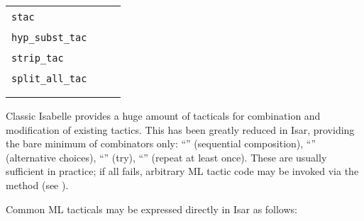 \begin{isabellebody}
\begin{isamarkuptext}
  \medskip
  \begin{tabular}{lll}
    \verb|stac|~\isa{{\isachardoublequote}a\ {\isadigit{1}}{\isachardoublequote}} & & \isa{{\isachardoublequote}subst\ a{\isachardoublequote}} \\
    \verb|hyp_subst_tac|~\isa{{\isadigit{1}}} & & \isa{hypsubst} \\
    \verb|strip_tac|~\isa{{\isadigit{1}}} & \isa{{\isachardoublequote}{\isasymapprox}{\isachardoublequote}} & \isa{{\isachardoublequote}intro\ strip{\isachardoublequote}} \\
    \verb|split_all_tac|~\isa{{\isadigit{1}}} & & \isa{{\isachardoublequote}simp\ {\isacharparenleft}no{\isacharunderscore}asm{\isacharunderscore}simp{\isacharparenright}\ only{\isacharcolon}\ split{\isacharunderscore}tupled{\isacharunderscore}all{\isachardoublequote}} \\
      & \isa{{\isachardoublequote}{\isasymapprox}{\isachardoublequote}} & \isa{{\isachardoublequote}simp\ only{\isacharcolon}\ split{\isacharunderscore}tupled{\isacharunderscore}all{\isachardoublequote}} \\
      & \isa{{\isachardoublequote}{\isasymlless}{\isachardoublequote}} & \isa{{\isachardoublequote}clarify{\isachardoublequote}} \\
  \end{tabular}%
\end{isamarkuptext}%
\isamarkuptrue%
%
\isamarkuptrue%
%
\begin{isamarkuptext}%
Classic Isabelle provides a huge amount of tacticals for combination
  and modification of existing tactics.  This has been greatly reduced
  in Isar, providing the bare minimum of combinators only: ``\isa{{\isachardoublequote}{\isacharcomma}{\isachardoublequote}}'' (sequential composition), ``\isa{{\isachardoublequote}{\isacharbar}{\isachardoublequote}}'' (alternative
  choices), ``\isa{{\isachardoublequote}{\isacharquery}{\isachardoublequote}}'' (try), ``\isa{{\isachardoublequote}{\isacharplus}{\isachardoublequote}}'' (repeat at least
  once).  These are usually sufficient in practice; if all fails,
  arbitrary ML tactic code may be invoked via the \mbox{}
  method (see ).

  \medskip Common ML tacticals may be expressed directly in Isar as
  follows:


\end{isamarkuptext}
\end{isabellebody}
